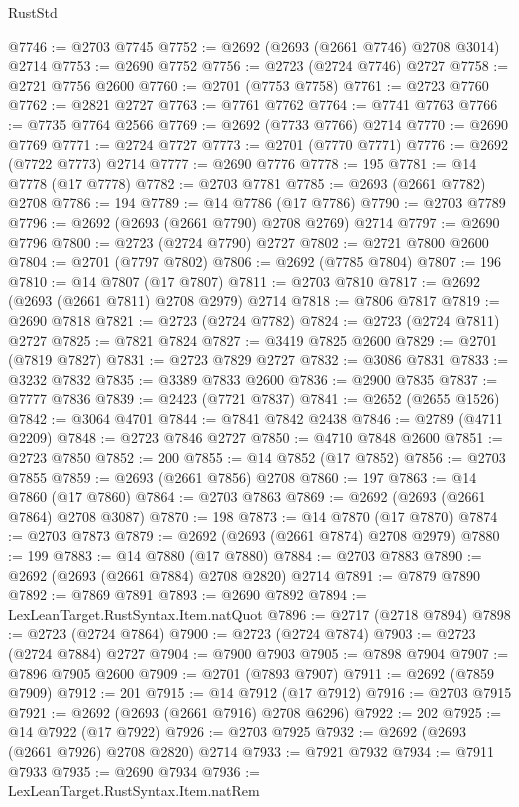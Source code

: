 \begin{lexlean}{RustStd}
\begin{coremodule}
@7746 := @2703 @7745
@7752 := @2692 (@2693 (@2661 @7746) @2708 @3014) @2714
@7753 := @2690 @7752
@7756 := @2723 (@2724 @7746) @2727
@7758 := @2721 @7756 @2600
@7760 := @2701 (@7753 @7758)
@7761 := @2723 @7760
@7762 := @2821 @2727
@7763 := @7761 @7762
@7764 := @7741 @7763
@7766 := @7735 @7764 @2566
@7769 := @2692 (@7733 @7766) @2714
@7770 := @2690 @7769
@7771 := @2724 @7727
@7773 := @2701 (@7770 @7771)
@7776 := @2692 (@7722 @7773) @2714
@7777 := @2690 @7776
@7778 := 195
@7781 := @14 @7778 (@17 @7778)
@7782 := @2703 @7781
@7785 := @2693 (@2661 @7782) @2708
@7786 := 194
@7789 := @14 @7786 (@17 @7786)
@7790 := @2703 @7789
@7796 := @2692 (@2693 (@2661 @7790) @2708 @2769) @2714
@7797 := @2690 @7796
@7800 := @2723 (@2724 @7790) @2727
@7802 := @2721 @7800 @2600
@7804 := @2701 (@7797 @7802)
@7806 := @2692 (@7785 @7804)
@7807 := 196
@7810 := @14 @7807 (@17 @7807)
@7811 := @2703 @7810
@7817 := @2692 (@2693 (@2661 @7811) @2708 @2979) @2714
@7818 := @7806 @7817
@7819 := @2690 @7818
@7821 := @2723 (@2724 @7782)
@7824 := @2723 (@2724 @7811) @2727
@7825 := @7821 @7824
@7827 := @3419 @7825 @2600
@7829 := @2701 (@7819 @7827)
@7831 := @2723 @7829 @2727
@7832 := @3086 @7831
@7833 := @3232 @7832
@7835 := @3389 @7833 @2600
@7836 := @2900 @7835
@7837 := @7777 @7836
@7839 := @2423 (@7721 @7837)
@7841 := @2652 (@2655 @1526)
@7842 := @3064 @4701
@7844 := @7841 @7842 @2438
@7846 := @2789 (@4711 @2209)
@7848 := @2723 @7846 @2727
@7850 := @4710 @7848 @2600
@7851 := @2723 @7850
@7852 := 200
@7855 := @14 @7852 (@17 @7852)
@7856 := @2703 @7855
@7859 := @2693 (@2661 @7856) @2708
@7860 := 197
@7863 := @14 @7860 (@17 @7860)
@7864 := @2703 @7863
@7869 := @2692 (@2693 (@2661 @7864) @2708 @3087)
@7870 := 198
@7873 := @14 @7870 (@17 @7870)
@7874 := @2703 @7873
@7879 := @2692 (@2693 (@2661 @7874) @2708 @2979)
@7880 := 199
@7883 := @14 @7880 (@17 @7880)
@7884 := @2703 @7883
@7890 := @2692 (@2693 (@2661 @7884) @2708 @2820) @2714
@7891 := @7879 @7890
@7892 := @7869 @7891
@7893 := @2690 @7892
@7894 := LexLeanTarget.RustSyntax.Item.natQuot
@7896 := @2717 (@2718 @7894)
@7898 := @2723 (@2724 @7864)
@7900 := @2723 (@2724 @7874)
@7903 := @2723 (@2724 @7884) @2727
@7904 := @7900 @7903
@7905 := @7898 @7904
@7907 := @7896 @7905 @2600
@7909 := @2701 (@7893 @7907)
@7911 := @2692 (@7859 @7909)
@7912 := 201
@7915 := @14 @7912 (@17 @7912)
@7916 := @2703 @7915
@7921 := @2692 (@2693 (@2661 @7916) @2708 @6296)
@7922 := 202
@7925 := @14 @7922 (@17 @7922)
@7926 := @2703 @7925
@7932 := @2692 (@2693 (@2661 @7926) @2708 @2820) @2714
@7933 := @7921 @7932
@7934 := @7911 @7933
@7935 := @2690 @7934
@7936 := LexLeanTarget.RustSyntax.Item.natRem

\end{coremodule}
\end{lexlean}
